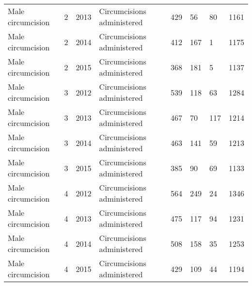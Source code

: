 \documentclass{article}
\begin{document}
\begin{table}[]
\begin{tabular}{llllllll}
Male circumcision                                      & 2    & 2013 & Circumcisions administered & 429       & 56                 & 80              & 1161   \\
Male circumcision                                      & 2    & 2014 & Circumcisions administered & 412       & 167                & 1               & 1175   \\
Male circumcision                                      & 2    & 2015 & Circumcisions administered & 368       & 181                & 5               & 1137   \\
Male circumcision                                      & 3    & 2012 & Circumcisions administered & 539       & 118                & 63              & 1284   \\
Male circumcision                                      & 3    & 2013 & Circumcisions administered & 467       & 70                 & 117             & 1214   \\
Male circumcision                                      & 3    & 2014 & Circumcisions administered & 463       & 141                & 59              & 1213   \\
Male circumcision                                      & 3    & 2015 & Circumcisions administered & 385       & 90                 & 69              & 1133   \\
Male circumcision                                      & 4    & 2012 & Circumcisions administered & 564       & 249                & 24              & 1346   \\
Male circumcision                                      & 4    & 2013 & Circumcisions administered & 475       & 117                & 94              & 1231   \\
Male circumcision                                      & 4    & 2014 & Circumcisions administered & 508       & 158                & 35              & 1253   \\
Male circumcision                                      & 4    & 2015 & Circumcisions administered & 429       & 109                & 44              & 1194
\end{tabular}
\end{table}

\end{document}
